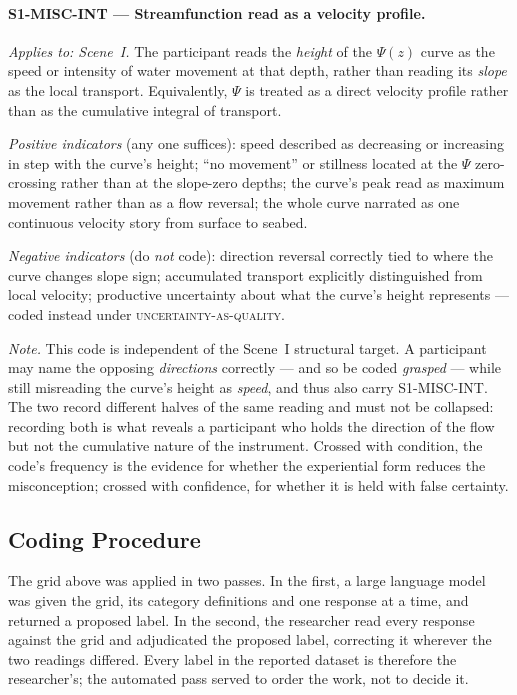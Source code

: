 \paragraph{S1-MISC-INT --- Streamfunction read as a velocity profile.}
\emph{Applies to: Scene~I.} The participant reads the \emph{height} of the $\Psi(z)$ curve as the speed or intensity of water movement at that depth, rather than reading its \emph{slope} as the local transport. Equivalently, $\Psi$ is treated as a direct velocity profile rather than as the cumulative integral of transport.

\emph{Positive indicators} (any one suffices): speed described as decreasing or increasing in step with the curve's height; ``no movement'' or stillness located at the $\Psi$ zero-crossing rather than at the slope-zero depths; the curve's peak read as maximum movement rather than as a flow reversal; the whole curve narrated as one continuous velocity story from surface to seabed.

\emph{Negative indicators} (do \emph{not} code): direction reversal correctly tied to where the curve changes slope sign; accumulated transport explicitly distinguished from local velocity; productive uncertainty about what the curve's height represents --- coded instead under \textsc{uncertainty-as-quality}.

\emph{Note.} This code is independent of the Scene~I structural target. A participant may name the opposing \emph{directions} correctly --- and so be coded \emph{grasped} --- while still misreading the curve's height as \emph{speed}, and thus also carry S1-MISC-INT. The two record different halves of the same reading and must not be collapsed: recording both is what reveals a participant who holds the direction of the flow but not the cumulative nature of the instrument. Crossed with condition, the code's frequency is the evidence for whether the experiential form reduces the misconception; crossed with confidence, for whether it is held with false certainty.

\subsection{Coding Procedure}
\label{subsec:app-procedure}

The grid above was applied in two passes. In the first, a large language model was given the
grid, its category definitions and one response at a time, and returned a proposed label. In
the second, the researcher read every response against the grid and adjudicated the proposed
label, correcting it wherever the two readings differed. Every label in the reported dataset
is therefore the researcher's; the automated pass served to order the work, not to decide it.


